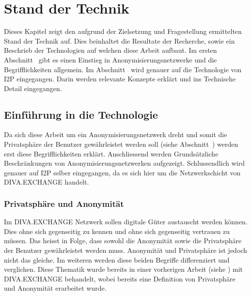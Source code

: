 \chapter{Stand der Technik}\label{ch:StandDerTechnik}


Dieses Kapitel zeigt den aufgrund der Zielsetzung und Fragestellung ermittelten Stand der Technik auf.
Dies beinhaltet die Resultate der Recherche, sowie ein Beschrieb der Technologien auf welchen diese Arbeit aufbaut.
Im ersten Abschnitt~ gibt es einen Einstieg in Anonymisierungsnetzwerke und die Begrifflichkeiten allgemein.
Im Abschnitt~ wird genauer auf die Technologie von I2P eingegangen.
Darin werden relevante Konzepte erklärt und ins Technische Detail eingegangen.

\section{Einführung in die Technologie}\label{sec:techintro}

Da sich diese Arbeit um ein Anonymisierungsnetzwerk dreht und somit die Privatsphäre der Benutzer gewährleistet werden soll (siehe Abschnitt~)
werden erst diese Begrifflichkeiten erklärt.
Anschliessend werden Grundsätzliche Beschränkungen von Anonymisierungsnetzwerken aufgezeigt.
Schlussendlich wird genauer auf I2P selber eingegangen, da es sich hier um die Netzwerkschicht von DIVA.EXCHANGE handelt.

\subsection{Privatsphäre und Anonymität}\label{sec:privacy_anonymity}

Im DIVA.EXCHANGE Netzwerk sollen digitale Güter austauscht werden können.
Dies ohne sich gegenseitig zu kennen und ohne sich gegenseitig vertrauen zu müssen.
Das heisst in Folge, dass sowohl die Anonymität sowie die Privatsphäre der Benutzer gewährleistet werden muss.
Anonymität und Privatsphäre ist jedoch nicht das gleiche. Im weiteren werden diese beiden Begriffe differenziert und verglichen.
Diese Thematik wurde bereits in einer vorherigen Arbeit (siehe \cite[S. 8-9]{maric_untersuchung_2020}) mit DIVA.EXCHANGE behandelt,
wobei bereits eine Definition von Privatsphäre und Anonymität erarbeitet wurde.

